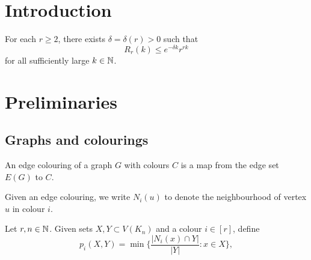 \section{Introduction}

\begin{theorem}\label{thm:Ramsey:multicolour}
  For each $r \ge 2$, there exists $\delta = \delta(r) > 0$ such that 
  \begin{equation*}
    R_r(k) \le e^{-\delta k} r^{rk}
  \end{equation*} 
  for all sufficiently large $k \in \mathbb{N}$. 
\end{theorem}


\section{Preliminaries}

\subsection{Graphs and colourings}

\begin{definition}
  \label{def:edge-colouring}
  \leanok
  An edge colouring of a graph $G$ with colours $C$ is a map from the edge set $E(G)$ to $C$.
\end{definition}

\begin{definition}
  \label{def:colour-neighborhood}
  \leanok
  Given an edge colouring, we write $N_i(u)$ to denote the neighbourhood of vertex $u$ in colour $i$.
\end{definition}

\begin{definition}
  \label{def:p}
  Let $r, n\in\mathbb{N}$. Given sets $X,Y \subset V(K_n)$ and a colour $i \in [r]$, define
  $$p_i(X,Y) = \min\bigg\{ \frac{|N_i(x) \cap Y|}{|Y|} : x \in X \bigg\},$$
\end{definition}


